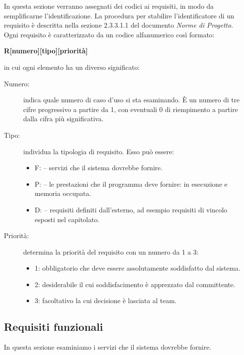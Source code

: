 \documentclass[../analisi-dei-requisiti.tex]{subfiles}
\begin{document}
In questa sezione verranno assegnati dei codici ai requisiti, in modo da semplificarne l’identificazione.
La procedura per stabilire l'identificatore di un requisito è descritta nella sezione 2.3.3.1.1 del documento \textit{Norme di Progetto}.
Ogni requisito è caratterizzato da un codice alfanumerico così formato:
\begin{center}
  \textbf{R[numero][tipo][priorità]}
\end{center}
in cui ogni elemento ha un diverso significato:
\begin{description}
  \item[Numero:] indica quale numero di caso d'uso si sta esaminando. È un numero di tre cifre progressivo a partire da 1, con eventuali 0 di riempimento a partire dalla cifra più significativa.
  \item[Tipo:] individua la tipologia di requisito. Esso può essere:
        \begin{itemize}
          \item F: \@funzionale -- \@indica servizi che il sistema dovrebbe fornire.
          \item P: \@prestazionale -- \@indica le prestazioni che il programma deve fornire:  in esecuzione e memoria occupata.
          \item D: \@dichiarativo -- \@indica requisiti definiti dall'esterno, ad esempio requisiti di vincolo esposti nel capitolato.
        \end{itemize}
  \item[Priorità:] determina la priorità del requisito con un numero da 1 a 3:
        \begin{itemize}
          \item 1: \@requisito obbligatorio che deve essere assolutamente soddisfatto dal sistema.
          \item 2: \@requisito desiderabile il cui soddisfacimento è apprezzato dal committente.
          \item 3: \@requisito facoltativo la cui decisione è lasciata al team.
        \end{itemize}
\end{description}


\subsection{Requisiti funzionali}%
\label{sub:requisiti_funzionali}
In questa sezione esaminiamo i servizi che il sistema dovrebbe fornire.
\end{document}
